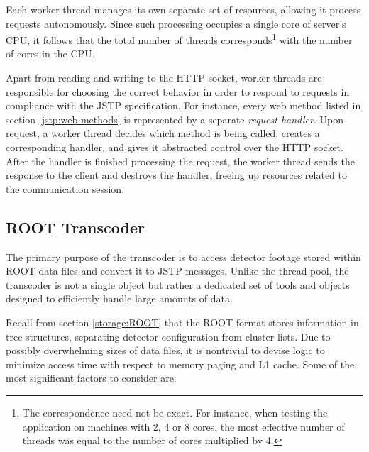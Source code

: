 Each worker thread manages its own separate set of resources, allowing it process requests autonomously. Since such processing occupies a single core of server's CPU, it follows that the total number of threads corresponds\footnote{The correspondence need not be exact. For instance, when testing the application on machines with 2, 4 or 8 cores, the most effective number of threads was equal to the number of cores multiplied by 4.} with the number of cores in the CPU.

Apart from reading and writing to the HTTP socket, worker threads are responsible for choosing the correct behavior in order to respond to requests in compliance with the JSTP specification. For instance, every web method listed in section \ref{jstp:web-methods} is represented by a separate \textit{request handler}. Upon request, a worker thread decides which method is being called, creates a corresponding handler, and gives it abstracted control over the HTTP socket. After the handler is finished processing the request, the worker thread sends the response to the client and destroys the handler, freeing up resources related to the communication session.

\subsection{ROOT Transcoder}
The primary purpose of the transcoder is to access detector footage stored within ROOT data files and convert it to JSTP messages. Unlike the thread pool, the transcoder is not a single object but rather a dedicated set of tools and objects designed to efficiently handle large amounts of data.

Recall from section \ref{storage:ROOT} that the ROOT format stores information in tree structures, separating detector configuration from cluster lists. Due to possibly overwhelming sizes of data files, it is nontrivial to devise logic to minimize access time with respect to memory paging and L1 cache. Some of the most significant factors to consider are:

